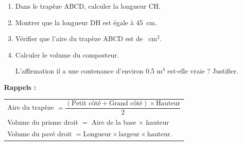 \begin{enumerate}
	\begin{enumerate}
		\item Dans le trapèze ABCD, calculer la longueur CH.
		\item Montrer que la longueur DH est égale à 45~cm.
		\item Vérifier que l'aire du trapèze ABCD est de ~cm$^2$.
		\item Calculer le volume du composteur.
		
L'affirmation \og il a une contenance d'environ 0,5 m$^3$ \fg{} est-elle vraie ? Justifier.
	\end{enumerate}
\end{enumerate}	
\medskip

\textbf{Rappels :}

\begin{tabularx}{\linewidth}{|X|}\hline
Aire du trapèze $ = \dfrac{(\text{Petit côté} + \text{Grand côté}) \times \text{Hauteur}}{2}$\rule[-3mm]{0mm}{9mm}\\
Volume du prisme droit $=$ Aire de la base $\times$  hauteur \\
Volume du pavé droit $= \text{Longueur} \times \text{largeur} \times  \text{hauteur}$.\\ \hline
\end{tabularx}

